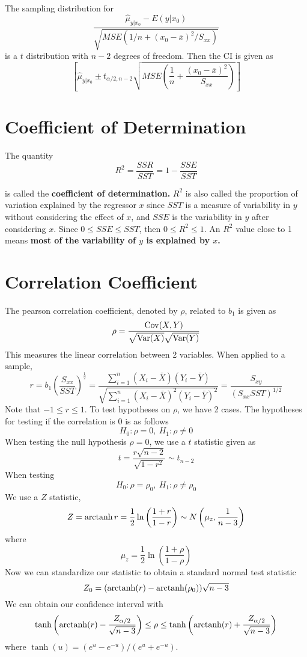 The sampling distribution for 
\[\frac{\hat{\mu}_{y|x_0} - E(y|x_0)}{\sqrt{MSE(1/n + (x_0-\bar{x})^2/S_{xx})}}\]
is a $t$ distribution with $n-2$ degrees of freedom. Then the CI is given as 
\[\left[\hat{\mu}_{y|x_0} \pm t_{\alpha/2, n-2}\sqrt{MSE\left(\frac{1}{n} + \frac{(x_0 - \bar{x})^2}{S_{xx}}\right)} \right]\]

\section{Coefficient of Determination}

The quantity 
\[R^2 = \frac{SSR}{SST} = 1 - \frac{SSE}{SST}\]

is called the \textbf{coefficient of determination.} $R^2$ is also called the proportion of variation explained by the regressor $x$ since $SST$ is a measure of variability in $y$ without considering the effect of $x$, and $SSE$ is the variability in $y$ after considering $x$. Since $0 \leq SSE \leq SST$, then $0 \leq R^2 \leq 1$. An $R^2$ value close to 1 means \textbf{most of the variability of $y$ is explained by $x$.}  


\section{Correlation Coefficient}

The pearson correlation coefficient, denoted by $\rho$, related to $b_1$ is given as
\[\rho = \frac{\operatorname{Cov}(X,Y)}{\sqrt{\operatorname{Var}(X)}\sqrt{\operatorname{Var}(Y)}}\]
This measures the linear correlation between 2 variables. When applied to a sample, 
\[r = b_1\left(\frac{S_{xx}}{SST}\right)^{\frac{1}{2}} = \frac{\sum_{i=1}^n(X_i - \bar{X})(Y_i - \bar{Y})}{\sqrt{\sum_{i=1}^n (X_i - \bar{X})^2(Y_i - \bar{Y})^2}} = \frac{S_{xy}}{(S_{xx}SST)^{1/2}}\]
Note that $-1 \leq r \leq 1$. To test hypotheses on $\rho$, we have 2 cases. The hypotheses for testing if the correlation is 0 is as follows 
\[H_0: \rho = 0, \ H_1: \rho \neq 0\]
When testing the null hypothesis $\rho = 0$, we use a $t$ statistic given as 
\[t = \frac{r\sqrt{n-2}}{\sqrt{1-r^2}} \sim t_{n-2}\]
When testing 
\[H_0: \rho = \rho_0, \ H_1: \rho \neq \rho_0\]
We use a $Z$ statistic, 
\[Z = \operatorname{arctanh} r = \frac{1}{2}\ln \left(\frac{1+r}{1-r}\right) \sim N\left(\mu_z, \frac{1}{n-3}\right)\]
where 
\[\mu_z = \frac{1}{2}\ln\left(\frac{1+\rho}{1 - \rho}\right)\]
Now we can standardize our statistic to obtain a standard normal test statistic
\[Z_0 = (\operatorname{arctanh}(r) - \operatorname{arctanh}(\rho_0))\sqrt{n-3}\]
We can obtain our confidence interval with 
\[\tanh\left(\operatorname{arctanh}(r) - \frac{Z_{\alpha/2}}{\sqrt{n-3}}\right) \leq \rho \leq \tanh\left(\operatorname{arctanh}(r) + \frac{Z_{\alpha/2}}{\sqrt{n-3}}\right)\]
where $\tanh(u) = (e^u-e^{-u})/(e^u + e^{-u})$.